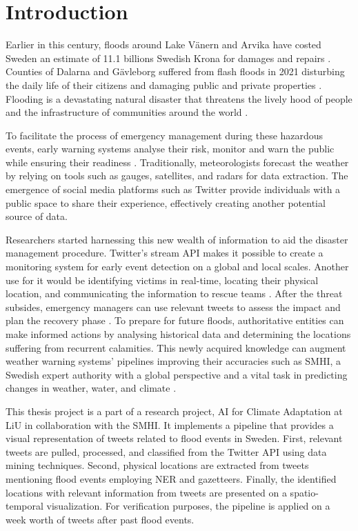 \section{Introduction}

Earlier in this century, floods around Lake Vänern and Arvika have costed Sweden an estimate of 11.1
billions Swedish Krona for damages and repairs \cite{RiverFloodsSweden2022}. Counties of Dalarna and
Gävleborg suffered from flash floods in 2021 disturbing the daily life of their citizens and
damaging public and private properties \cite{daviesSwedenFlashFloods2021}.  Flooding is a
devastating natural disaster that threatens the lively hood of people and the infrastructure of
communities around the world \cite{Floodlist2021}.

To facilitate the process of emergency management during these hazardous events, early warning
systems analyse their risk, monitor and warn the public while ensuring their readiness
\cite{contributorsEarlyWarningSystem2022}. Traditionally, meteorologists forecast the weather by
relying on tools such as gauges, satellites, and radars for data extraction. The emergence of social
media platforms such as Twitter provide individuals with a public space to share their experience,
effectively creating another potential source of data.

Researchers started harnessing this new wealth of information to aid the disaster management
procedure.  Twitter's stream \ac{API} makes it possible to create a monitoring system for early event
detection on a global \cite{debruijnGlobalDatabaseHistoric2019b} and local
\cite{barkerDevelopmentNationalscaleRealtime2019} scales. Another use for it would be identifying
victims in real-time, locating their physical location, and communicating the information to rescue
teams \cite{singhEventClassificationLocation2019c}. After the threat subsides, emergency
managers can use relevant tweets to assess the impact and plan the recovery phase
\cite{barkerDevelopmentNationalscaleRealtime2019}. To prepare for future floods, authoritative
entities can make informed actions by analysing historical data and determining the locations
suffering from recurrent calamities. This newly acquired knowledge can augment weather warning
systems' pipelines improving their accuracies such as \ac{SMHI}, a Swedish expert authority with a
global perspective and a vital task in predicting changes in weather, water, and climate \cite{SMHI2021}.


This thesis project is a part of a research project, AI for Climate Adaptation
\cite{nesetAI4ClimateAdaptation} at \ac{LiU} in collaboration with the \ac{SMHI}. It implements a
pipeline that provides a visual representation of tweets related to flood events in Sweden. First,
relevant tweets are pulled, processed, and classified from the Twitter API using data mining
techniques. Second, physical locations are extracted from tweets mentioning flood events employing
\ac{NER} and gazetteers. Finally, the identified locations with relevant information from tweets are
presented on a spatio-temporal visualization. For verification purposes, the pipeline is applied on
a week worth of tweets after past flood events.
